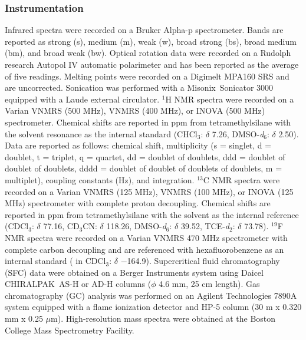 \subsubsection{Instrumentation}
Infrared spectra were recorded on a Bruker Alpha-p spectrometer. Bands are reported as strong (s),
medium (m), weak (w), broad strong (bs), broad medium (bm), and broad weak (bw). Optical rotation
data were recorded on a Rudolph research Autopol IV automatic polarimeter and has been reported as
the average of five readings. Melting points were recorded on a Digimelt MPA160 SRS and are uncorrected.
Sonication was performed with a Misonix\regtm\  Sonicator 3000 equipped with a Laude external
circulator.
$^1$H NMR spectra were recorded on a Varian VNMRS (500 MHz), VNMRS (400 MHz), or INOVA (500 MHz)
spectrometer.
Chemical shifts are reported in ppm from tetramethylsilane with the solvent resonance as the internal
standard (CHCl$_3$: $\delta$ 7.26, DMSO-\textit{d}$_{6}$: $\delta$ 2.50). Data are reported as
follows:
chemical shift, multiplicity (s = singlet, d = doublet, t = triplet, q = quartet, dd = doublet of
doublets, ddd = doublet of doublet of doublets, dddd = doublet of doublet of
doublets of doublets, m = multiplet), coupling constants (Hz), and integration. $^{13}$C NMR spectra
were recorded on a Varian VNMRS (125 MHz), VNMRS (100 MHz), or INOVA (125 MHz) spectrometer with complete proton
decoupling.
Chemical shifts are reported in ppm from tetramethylsilane with the solvent as the internal
reference (CDCl$_3$: $\delta$ 77.16, CD$_3$CN: $\delta$ 118.26, DMSO-\textit{d}$_6$: $\delta$ 39.52,
TCE-\textit{d}$_2$: $\delta$ 73.78).
$^{19}$F NMR spectra were recorded on a Varian VNMRS 470 MHz spectrometer with complete carbon
decoupling and are referenced with hexafluorobenzene as an internal standard ( in CDCl$_3$: $\delta$ $-$164.9). Supercritical fluid chromatography
(SFC) data were obtained on a Berger Instruments system using Daicel CHIRALPAK\regtm\ 	AS-H or AD-H
columns ($\phi$ 4.6 mm, 25 cm length). Gas chromatography (GC) analysis was performed on an Agilent
Technologies 7890A system equipped with a flame ionization detector and HP-5 column (30 m x 0.320 mm
x 0.25 $\mu$m). High-resolution mass spectra were obtained at the Boston College Mass Spectrometry
Facility.


\pagebreak
